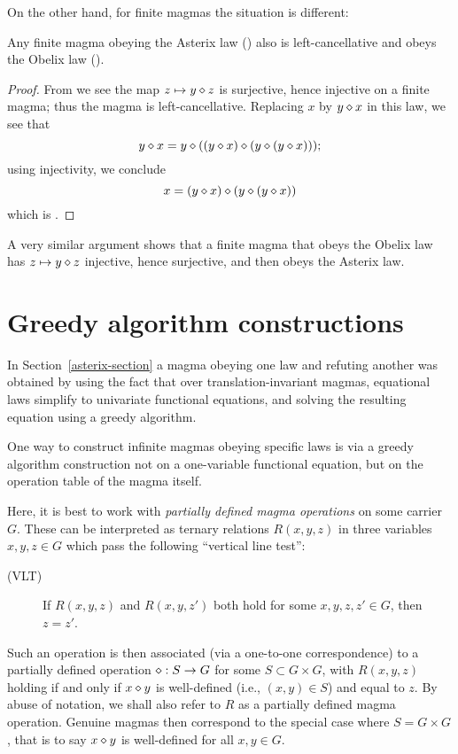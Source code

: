 On the other hand, for finite magmas the situation is different:

\begin{proposition}\label{asterix-obelix-finite}  Any finite magma obeying the Asterix law () also is left-cancellative and obeys the Obelix law ().
\end{proposition}

\begin{proof}  From  we see the map $z \mapsto y \diamond z$ is surjective, hence injective on a finite magma; thus the magma is left-cancellative.  Replacing $x$ by $y \diamond x$ in this law, we see that
$$ y \diamond x = y \diamond ((y\diamond x) \diamond (y \diamond (y \diamond x)));$$
using injectivity, we conclude
$$ x = (y\diamond x) \diamond (y \diamond (y \diamond x))$$
which is .
\end{proof}

A very similar argument shows that a finite magma that obeys the Obelix law has $z \mapsto y \diamond z$ injective, hence surjective, and then obeys the Asterix law.


\section{Greedy algorithm constructions}\label{greedy-section}

In Section~\ref{asterix-section} a magma obeying one law and refuting another was obtained by using the
fact that over translation-invariant magmas, equational laws simplify to univariate functional equations,
and solving the resulting equation using a greedy algorithm.

One way to construct infinite magmas obeying specific laws is via a greedy algorithm construction not on a
one-variable functional equation, but on the operation table of the magma itself.

Here, it is best to work with \emph{partially defined magma operations} on some carrier $G$.  These can be interpreted as ternary relations $R(x,y,z)$ in three variables $x,y,z \in G$ which pass the following ``vertical line test'':

\begin{description}
  \item[(VLT)] If $R(x,y,z)$ and $R(x,y,z')$ both hold for some $x,y,z,z' \in G$, then $z=z'$.
\end{description}

Such an operation is then associated (via a one-to-one correspondence) to a partially defined operation $\diamond : S \to G$ for some $S \subset G \times G$, with $R(x,y,z)$ holding if and only if $x \diamond y$ is well-defined (i.e., $(x,y) \in S$) and equal to $z$.  By abuse of notation, we shall also refer to $R$ as a partially defined magma operation.  Genuine magmas then correspond to the special case where $S = G \times G$, that is to say $x \diamond y$ is well-defined for all $x,y \in G$.

